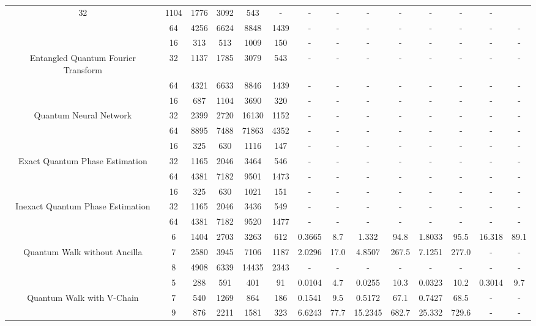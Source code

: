 \begin{table}[htb]
{\begin{tabular}{|c|c|c|c|c|c|c|c|c|c|c|c|c|c|}
32 & 1104 & 1776 & 3092 & 543
 & - & -
 & - & -
 & - & -
 & - & -
 \\
 & 
64 & 4256 & 6624 & 8848 & 1439
 & - & -
 & - & -
 & - & -
 & - & -
 \\
\hline
 & 
16 & 313 & 513 & 1009 & 150
 & - & -
 & - & -
 & - & -
 & - & -
 \\
Entangled Quantum Fourier Transform & 
32 & 1137 & 1785 & 3079 & 543
 & - & -
 & - & -
 & - & -
 & - & -
 \\
 & 
64 & 4321 & 6633 & 8846 & 1439
 & - & -
 & - & -
 & - & -
 & - & -
 \\
\hline
 & 
16 & 687 & 1104 & 3690 & 320
 & - & -
 & - & -
 & - & -
 & - & -
 \\
Quantum Neural Network & 
32 & 2399 & 2720 & 16130 & 1152
 & - & -
 & - & -
 & - & -
 & - & -
 \\
 & 
64 & 8895 & 7488 & 71863 & 4352
 & - & -
 & - & -
 & - & -
 & - & -
 \\
\hline
 & 
16 & 325 & 630 & 1116 & 147
 & - & -
 & - & -
 & - & -
 & - & -
 \\
Exact Quantum Phase Estimation & 
32 & 1165 & 2046 & 3464 & 546
 & - & -
 & - & -
 & - & -
 & - & -
 \\
 & 
64 & 4381 & 7182 & 9501 & 1473
 & - & -
 & - & -
 & - & -
 & - & -
 \\
\hline
 & 
16 & 325 & 630 & 1021 & 151
 & - & -
 & - & -
 & - & -
 & - & -
 \\
Inexact Quantum Phase Estimation & 
32 & 1165 & 2046 & 3436 & 549
 & - & -
 & - & -
 & - & -
 & - & -
 \\
 & 
64 & 4381 & 7182 & 9520 & 1477
 & - & -
 & - & -
 & - & -
 & - & -
 \\
\hline
 & 
6 & 1404 & 2703 & 3263 & 612
 & 0.3665 & 8.7
 & 1.332 & 94.8
 & 1.8033 & 95.5
 & 16.318 & 89.1
 \\
Quantum Walk without Ancilla & 
7 & 2580 & 3945 & 7106 & 1187
 & 2.0296 & 17.0
 & 4.8507 & 267.5
 & 7.1251 & 277.0
 & - & -
 \\
 & 
8 & 4908 & 6339 & 14435 & 2343
 & - & -
 & - & -
 & - & -
 & - & -
 \\
\hline
 & 
5 & 288 & 591 & 401 & 91
 & 0.0104 & 4.7
 & 0.0255 & 10.3
 & 0.0323 & 10.2
 & 0.3014 & 9.7
 \\
Quantum Walk with V-Chain & 
7 & 540 & 1269 & 864 & 186
 & 0.1541 & 9.5
 & 0.5172 & 67.1
 & 0.7427 & 68.5
 & - & -
 \\
 & 
9 & 876 & 2211 & 1581 & 323
 & 6.6243 & 77.7
 & 15.2345 & 682.7
 & 25.332 & 729.6
 & - & -
 \\

\end{tabular}}
\end{table}
